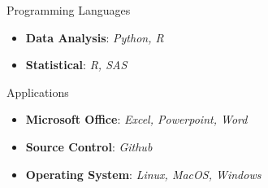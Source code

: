 
\Technology
{Programming Languages}
{\begin{itemize}
     \item \textbf{Data Analysis}:
     \emph{Python, R}
     \item \textbf{Statistical}:
     \emph{R, SAS}
\end{itemize}}

\vspace*{0.01 in}

\Technology
{Applications}
{\begin{itemize}
     \item \textbf{Microsoft Office}:
     \emph{Excel, Powerpoint, Word}
     \item \textbf{Source Control}:
     \emph{Github}
     \item \textbf{Operating System}:
     \emph{Linux, MacOS, Windows}
\end{itemize}}